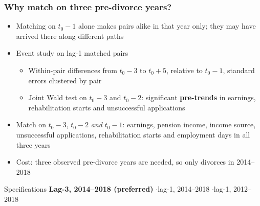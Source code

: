 \documentclass[t,20pt]{beamer}
\newcommand{\hl}[1]{\textcolor{BiBViolett}{\textbf{#1}}}           %
\begin{document}
\begin{bibframe}
  \frametitle{Why match on three pre-divorce years?}
  \begin{itemize}
    \item Matching on $t_0-1$ alone makes pairs alike in that year only; they may have arrived there along different paths
    \item Event study on lag-1 matched pairs
    \begin{itemize}
      \item Within-pair differences from $t_0-3$ to $t_0+5$, relative to $t_0-1$, standard errors clustered by pair
      \item Joint Wald test on $t_0-3$ and $t_0-2$: significant \hl{pre-trends} in earnings, rehabilitation starts and unsuccessful applications
    \end{itemize}
    \item[$\rightarrow$] Match on $t_0-3$, $t_0-2$ \textit{and} $t_0-1$: earnings, pension income, income source, unsuccessful applications, rehabilitation starts and employment days in all three years
    \item Cost: three observed pre-divorce years are needed, so only divorces in 2014--2018
  \end{itemize}
  \vspace{0.3cm}
  \begin{exampleblock}{Specifications}
    \textbf{Lag-3, 2014--2018 (preferred)} \quad$\cdot$\quad lag-1, 2014--2018 \quad$\cdot$\quad lag-1, 2012--2018
  \end{exampleblock}
\end{bibframe}
\end{document}

